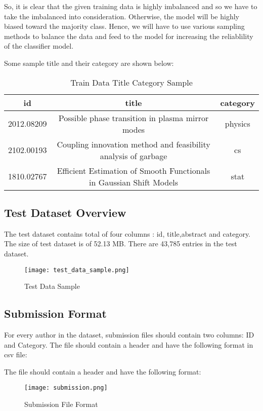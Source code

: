 So, it is clear that the given training data is highly imbalanced and so we have to take the imbalanced into consideration. Otherwise, the model will be highly biased toward the majority class. Hence, we will have to use various sampling methods to balance the data and feed to the model for increasing the reliablility of the classifier model.

Some sample title and their category are shown below:
\begin{table}[H]
    \begin{center}
        \begin{tabular}{ |c|c|c| }
            \hline
            id         & title                                                               & category \\
            \hline
            2012.08209 & Possible phase transition in plasma mirror modes
                       & physics                                                                        \\

            \hline
            2102.00193 & Coupling innovation method and feasibility analysis of garbage
                       & cs                                                                             \\

            \hline
            1810.02767 & Efficient Estimation of Smooth Functionals in Gaussian Shift Models & stat     \\
            \hline
        \end{tabular}
    \end{center}
    \caption{Train Data Title Category Sample}
    \label{table:Train Data Title Category Sample}
\end{table}

\subsection{Test Dataset Overview}
The test dataset contains total of four columns : id, title,abstract and category. The size of test dataset is of 52.13 MB. There are 43,785 entries in the test dataset. 

\begin{figure}[H]
    \centering
    \texttt{[image: test\_data\_sample.png]}
    \caption{Test Data Sample}
    \label{fig:Test Data Sample}
\end{figure}

\subsection{Submission Format}
For every author in the dataset, submission files should contain two columns: ID and Category. The file should contain a header and have the following format in csv file:

The file should contain a header and have the following format:

\begin{figure}[H]
    \centering
    \texttt{[image: submission.png]}
    \caption{Submission File Format}
    \label{fig:Submission File Format}
\end{figure}